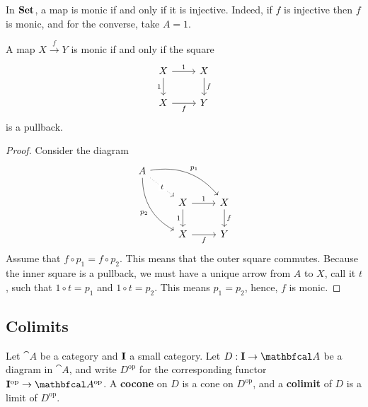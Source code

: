 \begin{example}
    In $\mathbf{Set}$, a map is monic if and only if it is injective. Indeed, if $f$ is injective then $f$ is monic, and for the converse, take $A=1$.
\end{example}

\begin{lemma}
    A map $X\xrightarrow{f}Y$ is monic if and only if the square
    \begin{equation*}
    \begin{tikzcd}
        X \arrow[r, "1"] \arrow[d, "1"'] & X \arrow[d, "f"] \\
        X \arrow[r, "f"'] & Y
    \end{tikzcd}
    \end{equation*}
    is a pullback.
\end{lemma}
\begin{proof}
    Consider the diagram
    \begin{equation*}
    \begin{tikzcd}
        A \arrow[drr, bend left, "p_1"] \arrow[ddr, bend right, "p_2"'] \arrow[dr, dotted, "t"description] \\
        & X \arrow[r, "1"] \arrow[d, "1"'] & X \arrow[d, "f"] \\
        & X \arrow[r, "f"'] & Y
    \end{tikzcd}
    \end{equation*}
    Assume that $f\circ p_1=f\circ p_2$. This means that the outer square commutes. Because the inner square is a pullback, we must have a unique arrow from $A$ to $X$, call it $t$, such that $1\circ t=p_1$ and $1\circ t=p_2$. This means $p_1=p_2$, hence, $f$ is monic.
\end{proof}

\subsection{Colimits}
\begin{definition}
    Let $\cat{A}$ be a category and $\mathbf{I}$ a small category. Let $D:\bcat{I}\to\cat{A}$ be a diagram in $\cat{A}$, and write $D^{\text{op}}$ for the corresponding functor $\bcatop{I}\to\catop{A}$. A \textbf{cocone} on $D$ is a cone on $D^{\text{op}}$, and a \textbf{colimit} of $D$ is a limit of $D^{\text{op}}$.
\end{definition}

